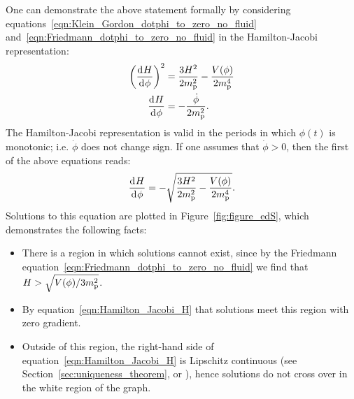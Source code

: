 One can demonstrate the above statement formally by considering equations~\eqref{eqn:Klein_Gordon_dotphi_to_zero_no_fluid} and~\eqref{eqn:Friedmann_dotphi_to_zero_no_fluid} in the Hamilton-Jacobi representation:
%
\begin{align}
  {\left(\frac{\operatorname{d}^{}\!{H}}{\operatorname{d}^{}\!{\phi}}\right)}^2
  &=
  \frac{3H^2}{2m_{\mathrm{p}}^2} - \frac{V(\phi)}{2m_{\mathrm{p}}^4}
  \\
  \frac{\operatorname{d}^{}\!{H}}{\operatorname{d}^{}\!{\phi}}
  &=
  -\frac{\dot{\phi}}{2m_{\mathrm{p}}^2}.
\end{align}
%
The Hamilton-Jacobi representation is valid in the periods in which \(\phi(t)\) is monotonic; i.e. \(\dot{\phi}\) does not change sign. If one assumes that \(\dot{\phi}>0\), then the first of the above equations reads:
%
\begin{equation}
  \frac{\operatorname{d}^{}\!{H}}{\operatorname{d}^{}\!{\phi}} 
  = 
  -\sqrt{\frac{3H^2}{2m_{\mathrm{p}}^2} - \frac{V(\phi)}{2m_{\mathrm{p}}^4}}.
  \label{eqn:Hamilton_Jacobi_H}
\end{equation}
%
Solutions to this equation are plotted in Figure~\ref{fig:figure_edS}, which demonstrates the following facts: 
%
\begin{itemize}
  \item There is a region in which solutions cannot exist, since by the Friedmann equation~\eqref{eqn:Friedmann_dotphi_to_zero_no_fluid} we find that \(H>\sqrt{V(\phi)/3m_{\mathrm{p}}^2}\).
  \item  By equation~\eqref{eqn:Hamilton_Jacobi_H} that solutions meet this region with zero gradient.
  \item Outside of this region, the right-hand side of equation~\eqref{eqn:Hamilton_Jacobi_H} is Lipschitz continuous (see Section~\ref{sec:uniqueness_theorem}, or \citet{agarwal_1993}), hence solutions do not cross over in the white region of the graph.
\end{itemize}
% 

